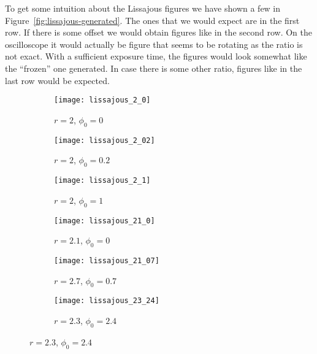 \documentclass[11pt, english, fleqn, DIV=15, headinclude, BCOR=2cm]{scrreprt}
\begin{document}
To get some intuition about the Lissajous figures we have shown a few in
Figure~\ref{fig:lissajous-generated}. The ones that we would expect are in the
first row. If there is some offset we would obtain figures like in the second
row. On the oscilloscope it would actually be figure that seems to be rotating
as the ratio is not exact. With a sufficient exposure time, the figures would
look somewhat like the \enquote{frozen} one generated. In case there is some
other ratio, figures like in the last row would be expected.

\begin{figure}
    \centering
    \begin{subfigure}[c]{0.3\linewidth}
        \centering
        \texttt{[image: lissajous\_2\_0]}
        \caption{%
            $r = 2$, $\phi_0 = 0$
            }
    \end{subfigure}
    \hfill
    \begin{subfigure}[c]{0.3\linewidth}
        \centering
        \texttt{[image: lissajous\_2\_02]}
        \caption{%
            $r = 2$, $\phi_0 = 0.2$
            }
    \end{subfigure}
    \hfill
    \begin{subfigure}[c]{0.3\linewidth}
        \centering
        \texttt{[image: lissajous\_2\_1]}
        \caption{%
            $r = 2$, $\phi_0 = 1$
            }
    \end{subfigure}

    \vspace{2ex}

    \begin{subfigure}[c]{0.3\linewidth}
        \centering
        \texttt{[image: lissajous\_21\_0]}
        \caption{%
            $r = 2.1$, $\phi_0 = 0$
            }
    \end{subfigure}
    \hfill
    \begin{subfigure}[c]{0.3\linewidth}
        \centering
        \texttt{[image: lissajous\_21\_07]}
        \caption{%
            $r = 2.7$, $\phi_0 = 0.7$
            }
    \end{subfigure}
    \hfill
    \begin{subfigure}[c]{0.3\linewidth}
        \centering
        \texttt{[image: lissajous\_23\_24]}
        \caption{%
            $r = 2.3$, $\phi_0 = 2.4$
            }
    \end{subfigure}

    \vspace{2ex}


\end{figure}
\end{document}
